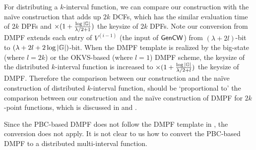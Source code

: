 For distributing a $k$-interval function, we can compare our construction with the na\"ive construction that adds up $2k$ DCFs, which has the similar evaluation time of $2k$ DPFs and $\times (1+\frac{\log |\mathbb{G}|}{\lambda/2+1})$ the keysize of $2k$ DPFs. Note our conversion from DMPF extends each entry of $V^{(i-1)}$ (the input of ${\sf Gen}{\sf CW}$) from $(\lambda +2l)$-bit to $(\lambda + 2l +2\log |\mathbb{G}|)$-bit. When the DMPF template is realized by the big-state (where $l=2k$) or the OKVS-based (where $l=1$) DMPF scheme, the keysize of the distributed $k$-interval function is increased to $\times (1+\frac{\log|\mathbb{G}|}{\lambda/2+l})$ the keysize of DMPF. Therefore the comparison between our construction and the na\"ive construction of distributed $k$-interval function, should be `proportional to' the comparison between our construction and the na\"ive construction of DMPF for $2k$-point functions, which is discussed in  and .

\begin{remark}
  Since the PBC-based DMPF does not follow the DMPF template in , the conversion does not apply. It is not clear to us how to convert the PBC-based DMPF to a distributed multi-interval function. 
\end{remark}
